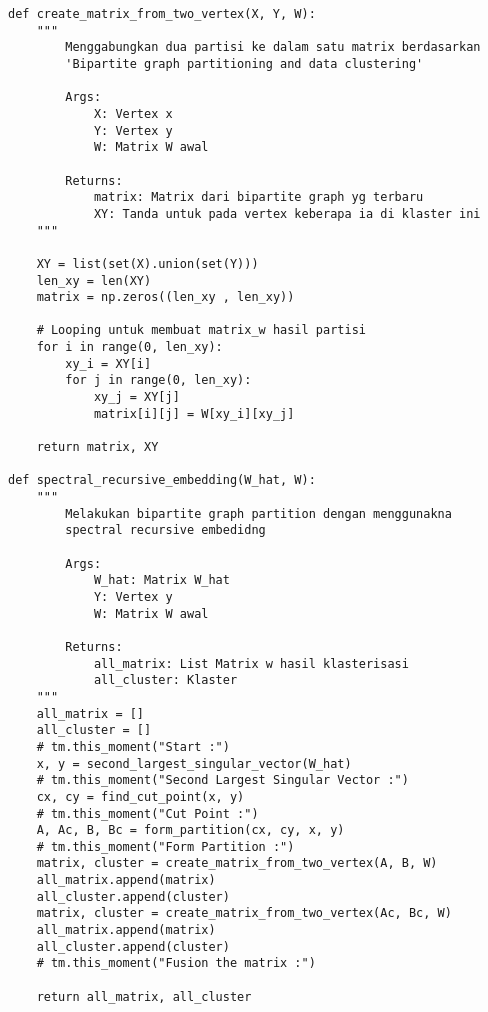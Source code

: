 \begin{lstlisting}[breaklines=true]
def create_matrix_from_two_vertex(X, Y, W):
	"""
		Menggabungkan dua partisi ke dalam satu matrix berdasarkan
		'Bipartite graph partitioning and data clustering'

		Args:
			X: Vertex x
			Y: Vertex y
			W: Matrix W awal

		Returns:
			matrix: Matrix dari bipartite graph yg terbaru
			XY: Tanda untuk pada vertex keberapa ia di klaster ini
	"""
	
	XY = list(set(X).union(set(Y)))
	len_xy = len(XY)
	matrix = np.zeros((len_xy , len_xy))
	
	# Looping untuk membuat matrix_w hasil partisi
	for i in range(0, len_xy):
		xy_i = XY[i]
		for j in range(0, len_xy):
			xy_j = XY[j]
			matrix[i][j] = W[xy_i][xy_j]
	
	return matrix, XY

def spectral_recursive_embedding(W_hat, W):
	"""
		Melakukan bipartite graph partition dengan menggunakna
		spectral recursive embedidng

		Args:
			W_hat: Matrix W_hat
			Y: Vertex y
			W: Matrix W awal

		Returns:
			all_matrix: List Matrix w hasil klasterisasi
			all_cluster: Klaster
	"""
	all_matrix = []
	all_cluster = []
	# tm.this_moment("Start :")
	x, y = second_largest_singular_vector(W_hat)
	# tm.this_moment("Second Largest Singular Vector :")
	cx, cy = find_cut_point(x, y)
	# tm.this_moment("Cut Point :")
	A, Ac, B, Bc = form_partition(cx, cy, x, y)
	# tm.this_moment("Form Partition :")
	matrix, cluster = create_matrix_from_two_vertex(A, B, W)
	all_matrix.append(matrix)
	all_cluster.append(cluster)
	matrix, cluster = create_matrix_from_two_vertex(Ac, Bc, W)
	all_matrix.append(matrix)
	all_cluster.append(cluster)
	# tm.this_moment("Fusion the matrix :")
	
	return all_matrix, all_cluster
\end{lstlisting}

